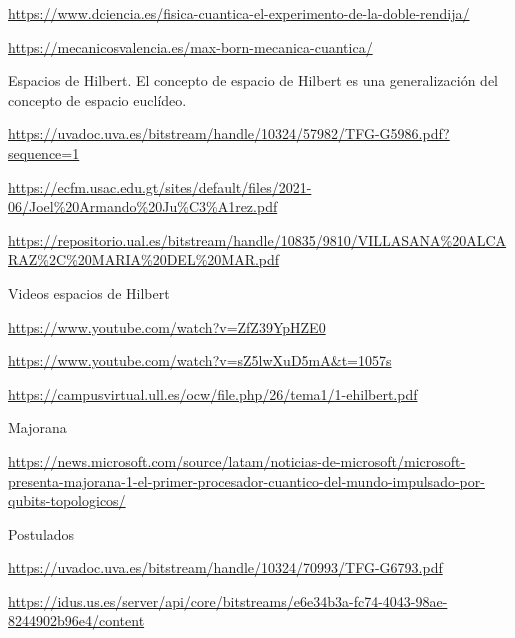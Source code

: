 \documentclass{article}
\numberwithin{equation}{section} %
\begin{document}
        \url{https://www.dciencia.es/fisica-cuantica-el-experimento-de-la-doble-rendija/}
        \vspace{2mm}

        \url{https://mecanicosvalencia.es/max-born-mecanica-cuantica/}
        \vspace{2mm}

        Espacios de Hilbert. El concepto de espacio de Hilbert es una generalización del concepto de espacio euclídeo.\par
        \url{https://uvadoc.uva.es/bitstream/handle/10324/57982/TFG-G5986.pdf?sequence=1}
        \vspace{2mm}

        \url{https://ecfm.usac.edu.gt/sites/default/files/2021-06/Joel%20Armando%20Ju%C3%A1rez.pdf}
        \vspace{2mm}

        \url{https://repositorio.ual.es/bitstream/handle/10835/9810/VILLASANA%20ALCARAZ%2C%20MARIA%20DEL%20MAR.pdf}
        \vspace{2mm}

        Videos espacios de Hilbert\par
        \url{https://www.youtube.com/watch?v=ZfZ39YpHZE0}
        \vspace{2mm}

        \url{https://www.youtube.com/watch?v=sZ5lwXuD5mA&t=1057s}
        \vspace{2mm}

        \url{https://campusvirtual.ull.es/ocw/file.php/26/tema1/1-ehilbert.pdf}
        \vspace{2mm}

        Majorana\par
        \url{https://news.microsoft.com/source/latam/noticias-de-microsoft/microsoft-presenta-majorana-1-el-primer-procesador-cuantico-del-mundo-impulsado-por-qubits-topologicos/}
        \vspace{2mm}

        Postulados\par
        \url{https://uvadoc.uva.es/bitstream/handle/10324/70993/TFG-G6793.pdf}
        \vspace{2mm}

        \url{https://idus.us.es/server/api/core/bitstreams/e6e34b3a-fc74-4043-98ae-8244902b96e4/content}
        \
    
\end{document}
